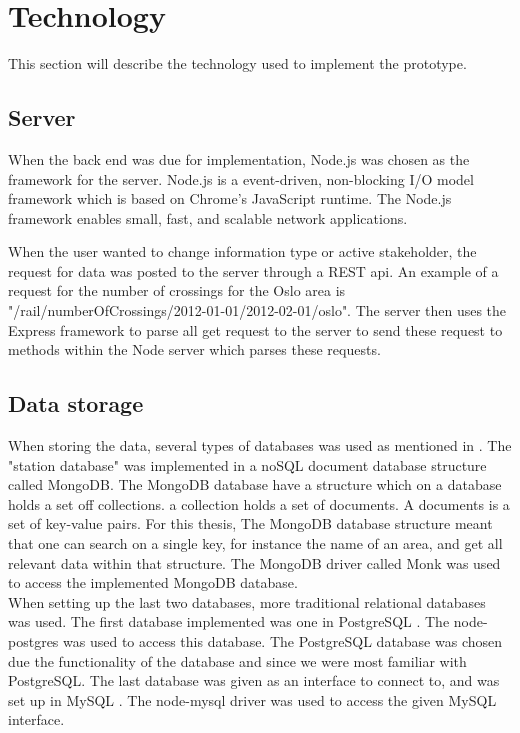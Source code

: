 \section{Technology} %
This section will describe the technology used to implement the prototype.
\label{sec:technology}

\subsection{Server} %
\label{sub:server}
When the back end was due for implementation, Node.js\cite{nodeJs} was chosen 
as the framework for the server. Node.js is a event-driven, non-blocking  I/O
model framework which is based on Chrome's\cite{chromeJavaScriptEngine} 
JavaScript runtime. The Node.js framework enables small, fast, and scalable 
network applications.

When the user wanted to change information type or active stakeholder, the
request for data was posted to the server through a REST\cite{REST} api. An
example of a request for the number of crossings for the Oslo area is
"/rail/numberOfCrossings/2012-01-01/2012-02-01/oslo". The server then uses the
Express\cite{express} framework to parse all get request to the server to send
these request to methods within the Node server which parses these requests.



\subsection{Data storage} %
\label{sub:technology_data_storage}
When storing the data, several types of databases was used as mentioned in
. The "station database" was implemented in
a noSQL document database structure called MongoDB\cite{mongoDB}. The MongoDB
database have a structure which on a database holds a set off collections. a
collection holds a set of documents. A documents is a set of key-value pairs.
For this thesis, The MongoDB database structure meant that one can search 
on a single key, for instance the name of an area, and get all relevant data 
within that structure. The MongoDB driver called Monk\cite{npmMonk} was used 
to access the implemented MongoDB database.\\

When setting up the last two databases, more traditional relational databases 
was used. The first database implemented was one in PostgreSQL
\cite{postgreSQLAbout}. The node-postgres\cite{node-postgres} was used to 
access this database. The PostgreSQL database was chosen due the functionality 
of the database and since we were most familiar with PostgreSQL. The 
last database was given as an interface to connect to, and was set up in MySQL
\cite{mySQLAbout}. The node-mysql\cite{node-mysql} driver was used to access 
the given MySQL interface.

